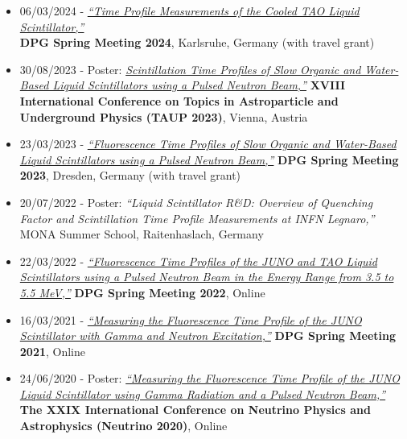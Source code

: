 \documentclass[letterpaper,12pt, oneside]{article}
\begin{document}
\begin{itemize}
\item 06/03/2024 - \href{https://www.dpg-verhandlungen.de/year/2024/conference/karlsruhe/part/t/session/57/contribution/2}{\textit{“Time Profile Measurements of the Cooled TAO Liquid Scintillator,”}}\\ \textbf{DPG Spring Meeting 2024}, Karlsruhe, Germany (with travel grant)

\item 30/08/2023 - Poster: \href{https://indico.cern.ch/event/1199289/contributions/5445889/}{\textit{Scintillation Time Profiles of Slow Organic and Water-Based Liquid Scintillators using a Pulsed Neutron Beam,”}} \textbf{XVIII International Conference on Topics in Astroparticle and Underground Physics (TAUP 2023)}, Vienna, Austria

\item 23/03/2023 - \href{https://www.dpg-verhandlungen.de/year/2023/conference/smuk/part/t/session/143/contribution/3}{\textit{“Fluorescence Time Profiles of Slow Organic and Water-Based Liquid Scintillators using a Pulsed Neutron Beam,”}} \textbf{DPG Spring Meeting 2023}, Dresden, Germany (with travel grant)

\item 20/07/2022 - Poster: {\textit{“Liquid Scintillator R\&D: Overview of Quenching Factor and Scintillation Time Profile Measurements at INFN Legnaro,”}} MONA Summer School, Raitenhaslach, Germany

\item 22/03/2022 - \href{https://www.dpg-verhandlungen.de/year/2022/conference/heidelberg/part/t/session/48/contribution/9}{\textit{“Fluorescence Time Profiles of the JUNO and TAO Liquid Scintillators using a Pulsed Neutron Beam in the Energy Range from 3.5 to 5.5 MeV,”}} \textbf{DPG Spring Meeting 2022}, Online

\item 16/03/2021 - \href{https://www.dpg-verhandlungen.de/year/2021/conference/dortmund/part/t/session/44/contribution/10}{\textit{“Measuring the Fluorescence Time Profile of the JUNO Scintillator with Gamma and Neutron Excitation,”}} \textbf{DPG Spring Meeting 2021}, Online

\item 24/06/2020 - Poster: \href{https://indico.fnal.gov/event/19348/contributions/186384/}{\textit{“Measuring the Fluorescence Time Profile of the JUNO Liquid Scintillator using Gamma Radiation and a Pulsed Neutron Beam,”}} \textbf{The XXIX International Conference on Neutrino Physics and Astrophysics (Neutrino 2020)}, Online


\end{itemize}
\end{document}
